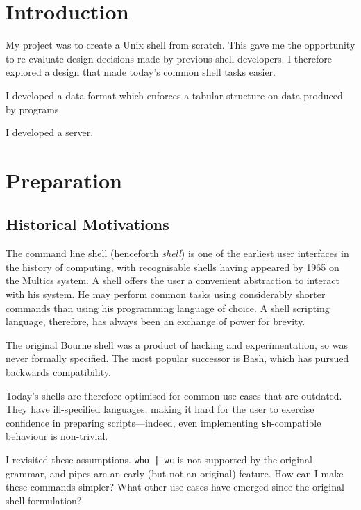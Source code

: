 \documentclass[12pt,twoside,notitlepage]{report}
\begin{document}
\cleardoublepage        %

\setcounter{page}{1}
\pagestyle{headings}

\chapter{Introduction}
My project was to create a Unix shell from scratch. This gave me the opportunity
to re-evaluate design decisions made by previous shell developers. I therefore
explored a design that made today's common shell tasks easier.

I developed a data format which enforces a tabular structure on data produced by
programs.

I developed a server.



\cleardoublepage

\chapter{Preparation}

\section{Historical Motivations}
The command line shell (henceforth \emph{shell}) is one of the earliest user
interfaces in the history of computing, with recognisable shells having appeared
by 1965 \cite{multics} on the Multics system. A shell offers the user a
convenient abstraction to interact with his system. He may perform common tasks
using considerably shorter commands than using his programming language of
choice. A shell scripting language, therefore, has always been an exchange of
power for brevity.

The original Bourne shell was a product of hacking and experimentation, so was
never formally specified. The most popular successor is Bash, which has pursued
backwards compatibility.

Today's shells are therefore optimised for common use cases that are
outdated. They have ill-specified languages, making it hard for the user to
exercise confidence in preparing scripts---indeed, even implementing
\texttt{sh}-compatible behaviour is non-trivial.

I revisited these assumptions. \texttt{who | wc} is not supported by the
original grammar, and pipes are an early (but not an original) feature. How can
I make these commands simpler? What other use cases have emerged since the
original shell formulation?
\end{document}
